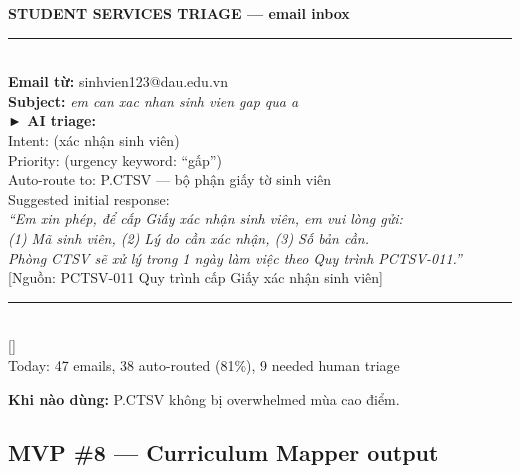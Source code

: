 \documentclass[11pt,a4paper]{article}
\begin{document}
\begin{mockbox}
{\bfseries\color{ink} STUDENT SERVICES TRIAGE --- email inbox}\\[6pt]
\rule{\linewidth}{0.3pt}\\[4pt]
{\bfseries Email từ:} sinhvien123@dau.edu.vn\\
{\bfseries Subject:} \textit{em can xac nhan sinh vien gap qua a}\\[4pt]
{\bfseries\color{leaf} ► AI triage:}\\
{\color{mid} Intent:}  (xác nhận sinh viên)\\
{\color{mid} Priority:}  (urgency keyword: ``gấp'')\\
{\color{mid} Auto-route to:} P.CTSV --- bộ phận giấy tờ sinh viên\\
{\color{mid} Suggested initial response:}\\[2pt]
\textit{``Em xin phép, để cấp Giấy xác nhận sinh viên, em vui lòng gửi:}\\
\textit{(1) Mã sinh viên, (2) Lý do cần xác nhận, (3) Số bản cần.}\\
\textit{Phòng CTSV sẽ xử lý trong 1 ngày làm việc theo Quy trình PCTSV-011.''}\\[2pt]
{\color{mid} [Nguồn: PCTSV-011 Quy trình cấp Giấy xác nhận sinh viên]}\\[6pt]
\rule{\linewidth}{0.3pt}\\[4pt]
{[]  }\\[6pt]
\textcolor{mid}{Today: 47 emails, 38 auto-routed (81\%), 9 needed human triage}
\end{mockbox}

\textbf{Khi nào dùng:} P.CTSV không bị overwhelmed mùa cao điểm.

\subsection{MVP \#8 --- Curriculum Mapper output}
\end{document}
